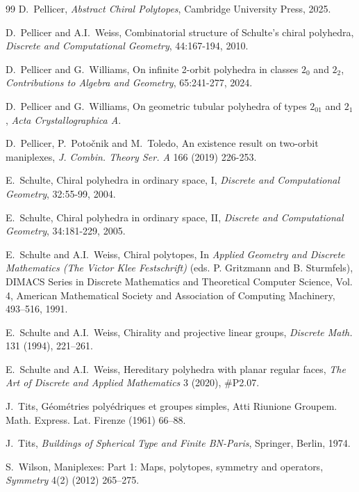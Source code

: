 \documentclass[12pt]{article}
\renewcommand{\>}{\rangle}
\theoremstyle{definition}\newtheorem{definition}{Definition}[section]
\begin{document}
\begin{thebibliography}{99}
D.~Pellicer, \textit{Abstract Chiral Polytopes\/}, Cambridge University Press, 2025.

D.~Pellicer and A.I.~Weiss, Combinatorial structure of Schulte’s chiral polyhedra, \textit{Discrete and Computational Geometry}, 44:167-194, 2010.

D.~Pellicer and G.~Williams, On infinite 2-orbit polyhedra in classes $2_0$ and $2_2$, \textit{Contributions to Algebra and Geometry}, 65:241-277, 2024.

D.~Pellicer and G.~Williams, On geometric tubular polyhedra of types $2_{01}$ and $2_1$, \textit{Acta Crystallographica A}.

 D.~Pellicer, P.~Potočnik and M.~Toledo, An existence result on two-orbit maniplexes, \textit{J. Combin. Theory Ser.
A} 166 (2019) 226-253.
  
E.~Schulte, Chiral polyhedra in ordinary space, I, \textit{Discrete and Computational Geometry}, 32:55-99, 2004. 

E.~Schulte, Chiral polyhedra in ordinary space, II, \textit{Discrete and Computational Geometry}, 34:181-229, 2005.

E.~Schulte and A.I.~Weiss, Chiral polytopes, In \textit{Applied Geometry and Discrete Mathematics (The Victor Klee Festschrift)} (eds. P. Gritzmann and B. Sturmfels), DIMACS Series in Discrete Mathematics and Theoretical Computer Science, Vol. 4, American Mathematical Society and Association of Computing Machinery, 493--516, 1991.

E.~Schulte and A.I.~Weiss, Chirality and projective linear groups,  {\em Discrete Math.\/} 131 (1994), 221--261.

E.~Schulte and A.I.~Weiss, Hereditary polyhedra with planar regular faces, {\em The Art of Discrete and Applied Mathematics\/} 3 (2020), \#P2.07.

J.~Tits, G\'eom\'etries poly\'edriques et groupes simples, Atti Riunione Groupem. Math. Express. Lat. Firenze (1961) 66--88.

J.~Tits, \textit{Buildings of Spherical Type and Finite BN-Paris}, Springer, Berlin, 1974.

S.~Wilson, Maniplexes: Part 1: Maps, polytopes, symmetry and operators, \textit{Symmetry} 4(2) (2012) 265--275.

\end{thebibliography}
 
\end{document}
